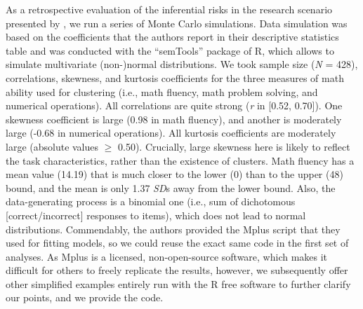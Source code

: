 \documentclass[letterpaper,11pt]{article}
\begin{document}
As a retrospective evaluation of the inferential risks in the research scenario presented by , we run a series of Monte Carlo simulations. Data simulation was based on the coefficients that the authors report in their descriptive statistics table and was conducted with the “semTools” package of R, which allows to simulate multivariate (non-)normal distributions. We took sample size (\textit{N} = 428), correlations, skewness, and kurtosis coefficients for the three measures of math ability used for clustering (i.e., math fluency, math problem solving, and numerical operations). All correlations are quite strong (\textit{r} in [0.52, 0.70]). One skewness coefficient is large (0.98 in math fluency), and another is moderately large (-0.68 in numerical operations). All kurtosis coefficients are moderately large (absolute values $\geq$ 0.50). Crucially, large skewness here is likely to reflect the task characteristics, rather than the existence of clusters. Math fluency has a mean value (14.19) that is much closer to the lower (0) than to the upper (48) bound, and the mean is only 1.37 \textit{SD}s away from the lower bound. Also, the data-generating process is a binomial one (i.e., sum of dichotomous [correct/incorrect] responses to items), which does not lead to normal distributions. Commendably, the authors provided the Mplus script that they used for fitting models, so we could reuse the exact same code in the first set of analyses. As Mplus is a licensed, non-open-source software, which makes it difficult for others to freely replicate the results, however, we subsequently offer other simplified examples entirely run with the R free software \cite{team2010r} to further clarify our points, and we provide the code. 
\end{document}
